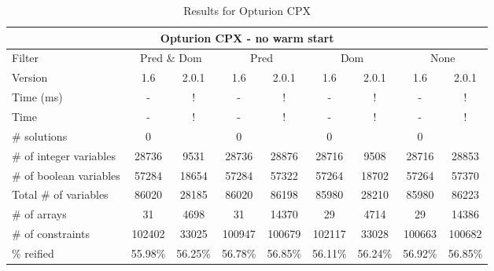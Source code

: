 \documentclass{standalone}
\begin{document}
\begin{table}[H]
\footnotesize
\centering
\begin{tabular}{lc|c|c|c|c|c|c|c}
\multicolumn{9}{c}{Opturion CPX - no warm start} \\ 
\hline\hline Filter & \multicolumn{2}{c|}{Pred \& Dom} &\multicolumn{2}{c|}{Pred}  & \multicolumn{2}{c|}{Dom} & \multicolumn{2}{c}{None} \\ 
\hline Version & 1.6 & 2.0.1 & 1.6 & 2.0.1 & 1.6 & 2.0.1 & 1.6 & 2.0.1 \\ 
Time (ms)               &    -     & !       & -       & !       & -       & !       & -       & !       \\ 
Time                    &    -     & !       & -       & !       & -       & !       & -       & !       \\ 
\# solutions & 0 &   & 0 &   & 0 &   & 0 &   \\
\# of integer variables & 28736    & 9531    & 28736   & 28876   & 28716   & 9508    & 28716   & 28853	  \\ 
\# of boolean variables & 57284    & 18654   & 57284   & 57322   & 57264   & 18702   & 57264   & 57370	  \\ 
Total \# of variables & 86020    & 28185   & 86020   & 86198   & 85980   & 28210   & 85980   & 86223	  \\ 
\# of arrays            & 31       & 4698    & 31      & 14370   & 29      & 4714   & 29      & 14386	  \\ 
\# of constraints       & 102402   & 33025   & 100947  & 100679  & 102117  & 33028   & 100663  & 100682  \\ 
\% reified               & 55.98\%  & 56.25\% & 56.78\% & 56.85\% & 56.11\% & 56.24\% & 56.92\% & 56.85\% \\ 
\end{tabular}
\caption{Results for Opturion CPX}\label{tab:res_cpx}
\end{table}
\end{document}
